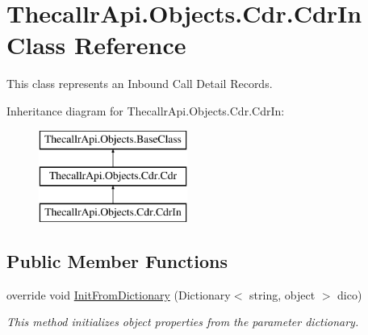 \hypertarget{class_thecallr_api_1_1_objects_1_1_cdr_1_1_cdr_in}{\section{Thecallr\+Api.\+Objects.\+Cdr.\+Cdr\+In Class Reference}
\label{class_thecallr_api_1_1_objects_1_1_cdr_1_1_cdr_in}
}


This class represents an Inbound Call Detail Records.  


Inheritance diagram for Thecallr\+Api.\+Objects.\+Cdr.\+Cdr\+In\+:\begin{figure}[H]
\begin{center}
\leavevmode
\includegraphics[height=3.000000cm]{class_thecallr_api_1_1_objects_1_1_cdr_1_1_cdr_in}
\end{center}
\end{figure}
\subsection*{Public Member Functions}
\begin{DoxyCompactItemize}
\item 
override void \hyperlink{class_thecallr_api_1_1_objects_1_1_cdr_1_1_cdr_in_a327298c791abec06fab4e425889aa320}{Init\+From\+Dictionary} (Dictionary$<$ string, object $>$ dico)
\begin{DoxyCompactList}\small\item\em This method initializes object properties from the parameter dictionary. \end{DoxyCompactList}\end{DoxyCompactItemize}

